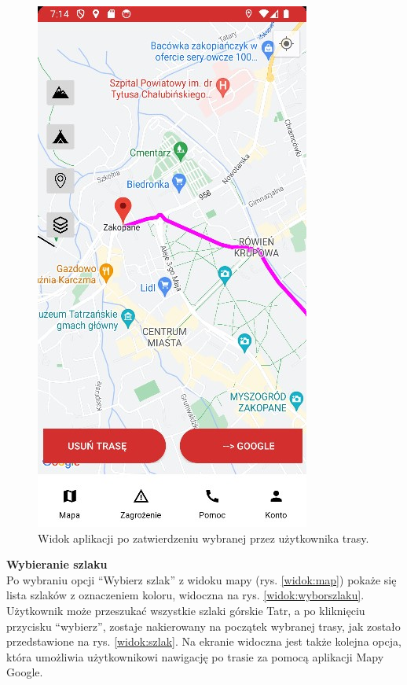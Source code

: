 \begin{figure}[H]
    \centering
    \includegraphics[scale=1.0]{img/test/testmap5.jpg}
    \caption{Widok aplikacji po zatwierdzeniu wybranej przez użytkownika trasy.}
    \label{widok:zatwierdztrase}
\end{figure}

\textbf{Wybieranie szlaku} \\
Po wybraniu opcji “Wybierz szlak” z widoku mapy (rys. \ref{widok:map}) pokaże się lista szlaków z oznaczeniem koloru, widoczna na rys. \ref{widok:wyborszlaku}. Użytkownik może przeszukać wszystkie szlaki górskie Tatr, a po kliknięciu przycisku “wybierz”, zostaje nakierowany na początek wybranej trasy, jak zostało przedstawione na rys. \ref{widok:szlak}. Na ekranie widoczna jest także kolejna opcja, która umożliwia użytkownikowi nawigację po trasie za pomocą aplikacji Mapy Google.\\

